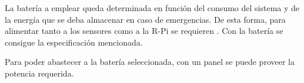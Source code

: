 
La batería a emplear queda determinada en función del consumo del sistema y de la energía que se deba almacenar en caso de emergencias. De esta forma, para alimentar tanto a los sensores como a la R-Pi se requieren \TBD. Con la batería \TBD se consigue la especificación mencionada.


\TBD


Para poder abastecer a la batería seleccionada, con un panel \TBD se puede proveer la potencia requerida.